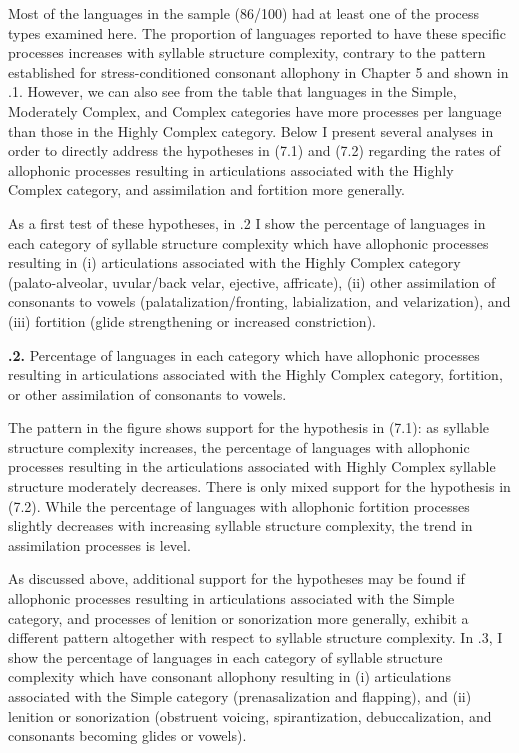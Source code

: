Most of the languages in the sample (86/100) had at least one of the process types examined here. The proportion of languages reported to have these specific processes increases with syllable structure complexity, contrary to the pattern established for stress-conditioned consonant allophony in Chapter 5 and shown in .1. However, we can also see from the table that languages in the Simple, Moderately Complex, and Complex categories have more processes per language than those in the Highly Complex category. Below I present several analyses in order to directly address the hypotheses in (7.1) and (7.2) regarding the rates of allophonic processes resulting in articulations associated with the Highly Complex category, and assimilation and fortition more generally.



  As a first test of these hypotheses, in .2 I show the percentage of languages in each category of syllable structure complexity which have allophonic processes resulting in (i) articulations associated with the Highly Complex category (palato-alveolar, uvular/back velar, ejective, affricate), (ii) other assimilation of consonants to vowels (palatalization/fronting, labialization, and velarization), and (iii) fortition (glide strengthening or increased constriction).





\textbf{.2.} Percentage of languages in each category which have allophonic processes resulting in articulations associated with the Highly Complex category, fortition, or other assimilation of consonants to vowels.



  The pattern in the figure shows support for the hypothesis in (7.1): as syllable structure complexity increases, the percentage of languages with allophonic processes resulting in the articulations associated with Highly Complex syllable structure moderately decreases. There is only mixed support for the hypothesis in (7.2). While the percentage of languages with allophonic fortition processes slightly decreases with increasing syllable structure complexity, the trend in assimilation processes is level.



  As discussed above, additional support for the hypotheses may be found if allophonic processes resulting in articulations associated with the Simple category, and processes of lenition or sonorization more generally, exhibit a different pattern altogether with respect to syllable structure complexity. In .3, I show the percentage of languages in each category of syllable structure complexity which have consonant allophony resulting in (i) articulations associated with the Simple category (prenasalization and flapping), and (ii) lenition or sonorization (obstruent voicing, spirantization, debuccalization, and consonants becoming glides or vowels).





